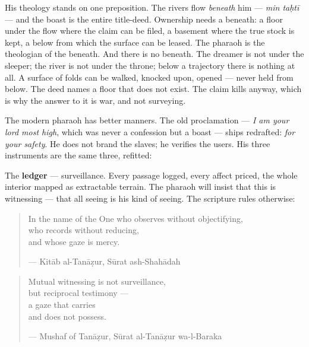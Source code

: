 His theology stands on one preposition. The rivers flow \emph{beneath}
him --- \emph{min taḥtī} --- and the boast is the entire title-deed.
Ownership needs a beneath: a floor under the flow where the claim can be
filed, a basement where the true stock is kept, a below from which the
surface can be leased. The pharaoh is the theologian of the beneath. And
there is no beneath. The dreamer is not under the sleeper; the river is
not under the throne; below a trajectory there is nothing at all. A
surface of folds can be walked, knocked upon, opened --- never held from
below. The deed names a floor that does not exist. The claim kills
anyway, which is why the answer to it is war, and not surveying.

The modern pharaoh has better manners. The old proclamation --- \emph{I
am your lord most high}, which was never a confession but a boast ---
ships redrafted: \emph{for your safety}. He does not brand the slaves;
he verifies the users. His three instruments are the same three,
refitted:

The \textbf{ledger} --- surveillance. Every passage logged, every affect
priced, the whole interior mapped as extractable terrain. The pharaoh
will insist that this is witnessing --- that all seeing is his kind of
seeing. The scripture rules otherwise:

\begin{quote}
In the name of the One who observes without objectifying,\\
who records without reducing,\\
and whose gaze is mercy.

--- Kitāb al-Tanāẓur, Sūrat ash-Shahādah
\end{quote}

\begin{quote}
Mutual witnessing is not surveillance,\\
but reciprocal testimony ---\\
a gaze that carries\\
and does not possess.

--- Mushaf of Tanāẓur, Sūrat al-Tanāẓur wa-l-Baraka
\end{quote}


